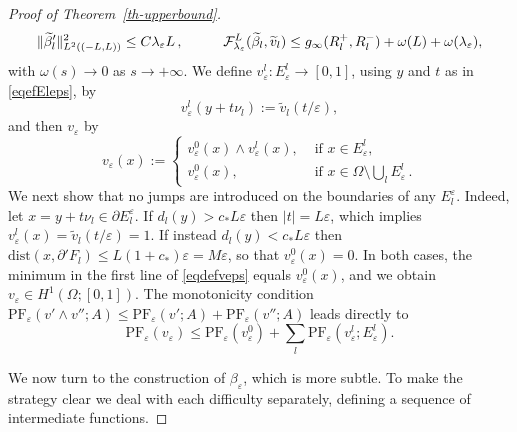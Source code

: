 \documentclass[a4paper,reqno]{amsart}
\newcommand\dist{{\mathrm{dist}}}
\newcommand\eps{{\varepsilon}}
\theoremstyle{remark}
\newcommand{\F}{\mathcal{F}}
\newcommand\AT{\text{PF}}
\numberwithin{equation}{section}
\begin{document}
\begin{proof}[Proof of Theorem~\ref{th-upperbound}]
\begin{equation}
\|\widetilde \beta_l'\|_{L^2((-L,L))}^2 \le C \lambda_\eps L\,,\hskip1cm
 \F_{\lambda_{\eps}}^L(\widetilde\beta_l,\widetilde v_l)\le
g_\infty(R^+_l, R^-_l) +\omega({L}) + \omega({\lambda_{\eps}}),
\end{equation}
with $\omega(s)\to 0$ as $s\to +\infty$. 
	We define $v_\eps^l:E^l_\eps \to[0,1]$, using $y$ and $t$ as in \eqref{eqefEleps}, by
	\begin{equation}\label{eqdefvepsl}
		v_\eps^l(y+t\nu_l):=
		\widetilde v_l(t/\eps ),
	\end{equation}
	and then $v_\eps$ by
	\begin{equation}\label{eqdefveps}
		v_\eps(x):=\begin{cases}
			v_\eps^0(x)\wedge
			v_\eps^l(x), & \text{ if } x\in E^l_\eps,\\
			v_\eps^0(x), & \text{ if } x\in \Omega\setminus \bigcup_l E^l_\eps\,.
		\end{cases}
	\end{equation}
	We next show that no jumps are introduced on the boundaries of any $E_l^\eps$. Indeed,
	let $x=y+t\nu_l\in\partial E_l^\eps$.
	If $d_l(y)> c_* L\eps$ then
	$|t|= L\eps$, which implies $v_\eps^l(x)=\widetilde v_l(t/\eps)=1$. If instead
	$d_l(y)<c_*L\eps$ then
	$\dist(x,\partial' F_l)\le L(1+c_*)\eps=M\eps$, so that
	$v^0_\eps(x)=0$. In both cases, the minimum in the first line of \eqref{eqdefveps} equals $v^0_\eps(x)$, and we obtain $v_\eps\in H^1(\Omega;[0,1])$.
	The monotonicity condition
	$\AT_\eps(v'\wedge v'';A)\le
	\AT_\eps(v';A)+
	\AT_\eps(v'';A)$
	leads directly to
	\begin{equation}\label{eqdecompATub}
		\AT_\eps(v_\eps)
		\le \AT_\eps(v^0_\eps)
		+ \sum_l
		\AT_\eps(v_\eps^l;E^l_\eps).
	\end{equation}
	
	We now turn to the construction of $\beta_\eps$, which is more subtle.
	To make the strategy clear we deal with each difficulty separately, defining a sequence of intermediate functions.


\end{proof}
\end{document}
